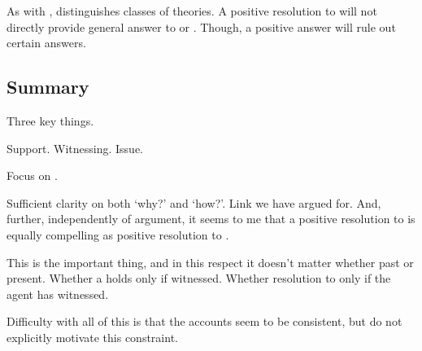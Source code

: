 \begin{note}
  As with \issueInclusion{}, \issueConstraint{} distinguishes classes of theories.
  A positive resolution to \issueInclusion{} will not directly provide general answer to \qWhy{} or \qHow{}.
  Though, a positive answer will rule out certain answers.
\end{note}

\subsection{Summary}
\label{cha:clar:expand:issue:summary}

\begin{note}
  Three key things.

  Support.
  Witnessing.
  Issue.
\end{note}

\begin{note}
  Focus on \issueConstraint{}.
  \vspace{-\baselineskip}
  \begin{quote}
    \rIssueConstraint*
  \end{quote}
  Sufficient clarity on both `why?' and `how?'.
  Link we have argued for.
  And, further, independently of argument, it seems to me that a positive resolution to \issueConstraint{} is equally compelling as positive resolution to \issueInclusion{}.
\end{note}

\begin{note}
  This is the important thing, and in this respect it doesn't matter whether past or present.
  Whether a \support{} holds only if witnessed.
  Whether resolution to \qWhy{} only if the agent has witnessed.
\end{note}

\begin{note}
  Difficulty with all of this is that the accounts seem to be consistent, but do not explicitly motivate this constraint.
\end{note}

